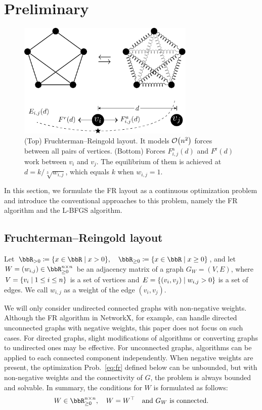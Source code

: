 \documentclass[dvipdfmx,10pt,journal,compsoc]{IEEEtran}
\newcommand{\defeq}{\coloneqq}
\begin{document}
\section{Preliminary}\label{sec:preliminary}

\begin{figure}[t]
    \centering
    \includegraphics[height=5.5cm]{fr_layout/fr_layout.pdf}
    \caption{
        (Top) Fruchterman--Reingold layout. It models $\order{n^2}$ forces between all pairs of vertices.
        (Bottom) Forces $F_{i,j}^\mathrm{a}(d)$ and $F^\mathrm{r}(d)$ work between $v_i$ and $v_j$. The equilibrium of them is achieved at $d = k/\sqrt[3]{w_{i,j}}$, which equals $k$ when $w_{i,j} = 1$.
    }
    \label{fig:frLayout}
\end{figure}

In this section, we formulate the FR layout as a continuous optimization problem and introduce the conventional approaches to this problem, namely the FR algorithm and the L-BFGS algorithm.

\subsection{Fruchterman--Reingold layout}\label{ssec:frLayout}

Let $\bbR_{> 0} \defeq \qty{ x \in \bbR \mid x > 0 }, \quad \bbR_{\geq 0} \defeq \qty{ x \in \bbR \mid x \geq 0 }$, and let $W = (w_{i,j}) \in \bbR_{\geq 0}^{n \times n}$ be an adjacency matrix of a graph $G_W = (V, E)$, where $V = \qty{v_i \mid 1 \leq i \leq n}$ is a set of vertices and $E = \qty{(v_i, v_j) \mid w_{i,j} > 0}$ is a set of edges. We call $w_{i,j}$ as a weight of the edge $(v_i, v_j)$.

We will only consider undirected connected graphs with non-negative weights.
Although the FR algorithm in NetworkX, for example, can handle directed unconnected graphs with negative weights, this paper does not focus on such cases.
For directed graphs, slight modifications of algorithms or converting graphs to undirected ones may be effective.
For unconnected graphs, algorithms can be applied to each connected component independently.
When negative weights are present, the optimization Prob.~\eqref{eq:fr} defined below can be unbounded, but with non-negative weights and the connectivity of $G$, the problem is always bounded and solvable.
In summary, the conditions for $W$ is formulated as follows:
\begin{equation}\label{eq:WCondition}
    W \in \bbR_{\geq 0}^{n \times n}, \quad W = W^\top \quad \text{and $G_W$ is connected}.
\end{equation}
\end{document}
